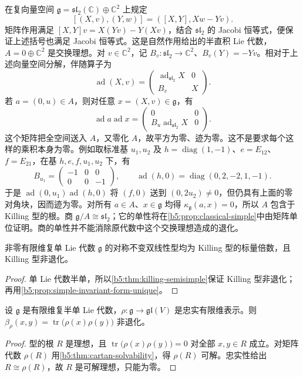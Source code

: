 \begin{example}\label{b5:exm:killing-semidirect-natural}
	在复向量空间 \(\mathfrak g=\mathfrak{sl}_2(\mathbb C)\oplus\mathbb C^2\) 上规定
	\[
		[(X,v),(Y,w)]=([X,Y],Xw-Yv).
	\]
	矩阵作用满足 \([X,Y]v=X(Yv)-Y(Xv)\)，结合 \(\mathfrak{sl}_2\) 的 Jacobi 恒等式，便保证上述括号也满足 Jacobi 恒等式。这是自然作用给出的半直积 Lie 代数，\(A=0\oplus\mathbb C^2\) 是交换理想。对 \(v\in\mathbb C^2\)，记 \(B_v:\mathfrak{sl}_2\to\mathbb C^2\)、\(B_v(Y)=-Yv\)。相对于上述向量空间分解，伴随算子为
	\[
		\operatorname{ad}(X,v)=
		\begin{pmatrix}\operatorname{ad}_{\mathfrak{sl}_2}X&0\\B_v&X\end{pmatrix}.
	\]
	若 \(a=(0,u)\in A\)，则对任意 \(x=(X,v)\in\mathfrak g\)，有
	\[
		\operatorname{ad}a\operatorname{ad}x
		=\begin{pmatrix}0&0\\B_u\operatorname{ad}_{\mathfrak{sl}_2}X&0\end{pmatrix}.
	\]
	这个矩阵把全空间送入 \(A\)，又零化 \(A\)，故平方为零、迹为零。这不是要求每个这样的乘积本身为零。例如取标准基 \(u_1,u_2\) 及 \(h=\operatorname{diag}(1,-1)\)、\(e=E_{12}\)、\(f=E_{21}\)，在基 \(h,e,f,u_1,u_2\) 下，有
	\[
		B_{u_1}=\begin{pmatrix}-1&0&0\\0&0&-1\end{pmatrix},\qquad
		\operatorname{ad}(h,0)=\operatorname{diag}(0,2,-2,1,-1).
	\]
	于是 \(\operatorname{ad}(0,u_1)\operatorname{ad}(h,0)\) 将 \((f,0)\) 送到 \((0,2u_2)\ne0\)，但仍具有上面的零对角块，因而迹为零。对所有 \(a\in A\)、\(x\in\mathfrak g\) 均得 \(\kappa_{\mathfrak g}(a,x)=0\)，所以 \(A\) 包含于 Killing 型的根。商 \(\mathfrak g/A\cong\mathfrak{sl}_2\)；它的单性将在\cref{b5:prop:classical-simple}中由矩阵单位证明。商的单性并不能消除原代数中这个交换理想造成的退化。
\end{example}

\begin{corollary}\label{b5:cor:simple-killing-forms}
	非零有限维复单 Lie 代数 \(\mathfrak g\) 的对称不变双线性型均为 Killing 型的标量倍数，且 Killing 型非退化。
\end{corollary}
\begin{proof}
	单 Lie 代数半单，所以\cref{b5:thm:killing-semisimple}保证 Killing 型非退化；再用\cref{b5:prop:simple-invariant-form-unique}。
\end{proof}

\begin{proposition}\label{b5:prop:faithful-trace-nondegenerate}
	设 \(\mathfrak g\) 是有限维复半单 Lie 代数，\(\rho:\mathfrak g\rightarrow\mathfrak{gl}(V)\) 是忠实有限维表示。则 \(\beta_\rho(x,y)=\operatorname{tr}\bigl(\rho(x)\rho(y)\bigr)\) 非退化。
\end{proposition}
\begin{proof}
	型的根 \(R\) 是理想，且 \(\operatorname{tr}\bigl(\rho(x)\rho(y)\bigr)=0\) 对全部 \(x,y\in R\) 成立。对矩阵代数 \(\rho(R)\) 用\cref{b5:thm:cartan-solvability}，得 \(\rho(R)\) 可解。忠实性给出 \(R\cong\rho(R)\)，故 \(R\) 是可解理想，只能为零。
\end{proof}

